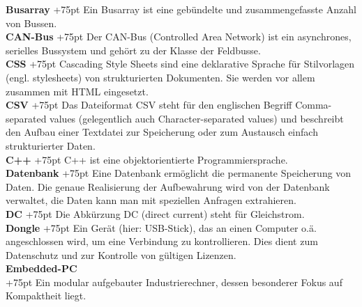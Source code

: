 \documentclass[fontsize = 12pt, paper = a4]{scrreprt}
\begin{document}
\textbf{Busarray}
\hangindent+75pt 
\hspace*{5.5mm} 
Ein Busarray ist eine gebündelte und zusammengefasste Anzahl von Bussen.\\

\textbf{CAN-Bus}
\hangindent+75pt 
\hspace*{3mm} 
Der CAN-Bus (Controlled Area Network) ist ein asynchrones, serielles Bussystem und gehört zu der Klasse der Feldbusse.\\

\textbf{CSS}
\hangindent+75pt 
\hspace*{15mm}
Cascading Style Sheets sind eine deklarative Sprache für Stilvorlagen (engl. stylesheets) von strukturierten Dokumenten. Sie werden vor allem zusammen mit HTML eingesetzt.\\


\textbf{CSV}
\hangindent+75pt 
\hspace*{13.5mm}
Das Dateiformat CSV steht für den englischen Begriff Comma-separated values (gelegentlich auch Character-separated values) und beschreibt den Aufbau einer Textdatei zur Speicherung oder zum Austausch einfach strukturierter Daten.\\

\textbf{C++}
\hangindent+75pt 
\hspace*{13.5mm}
C++ ist eine objektorientierte Programmiersprache.\\

\textbf{Datenbank}
\hangindent+75pt 
\hspace*{1.25mm}
Eine Datenbank ermöglicht die permanente Speicherung von Daten. Die genaue Realisierung der Aufbewahrung wird von der Datenbank verwaltet, die Daten kann man mit speziellen Anfragen extrahieren.\\

\textbf{DC}
\hangindent+75pt 
\hspace*{16.5mm}
Die Abkürzung DC (direct current) steht für Gleichstrom.\\

\textbf{Dongle}
\hangindent+75pt 
\hspace*{8.75mm}
Ein Gerät (hier: USB-Stick), das an einen Computer o.ä. angeschlossen wird, um eine Verbindung zu kontrollieren. Dies dient zum Datenschutz und zur Kontrolle von gültigen Lizenzen.\\

\textbf{Embedded-PC} \\
\hangindent+75pt  
Ein modular aufgebauter Industrierechner, dessen besonderer Fokus auf Kompaktheit liegt.\\
\end{document}
